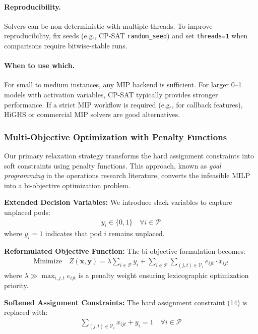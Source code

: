 \documentclass{article}
\begin{document}
\paragraph{Reproducibility.} Solvers can be non-deterministic with multiple threads. To improve reproducibility, fix seeds (e.g., CP-SAT \texttt{random\_seed}) and set \texttt{threads=1} when comparisons require bitwise-stable runs.

\paragraph{When to use which.} For small to medium instances, any MIP backend is sufficient. For larger 0--1 models with activation variables, CP-SAT typically provides stronger performance. If a strict MIP workflow is required (e.g., for callback features), HiGHS or commercial MIP solvers are good alternatives.

\subsubsection{Multi-Objective Optimization with Penalty Functions}

Our primary relaxation strategy transforms the hard assignment constraints into soft constraints using penalty functions. This approach, known as \textit{goal programming} in the operations research literature, converts the infeasible MILP into a bi-objective optimization problem.

\textbf{Extended Decision Variables:}
We introduce slack variables to capture unplaced pods:
\begin{align}
y_i \in \{0,1\} \quad \forall i \in \mathcal{P}
\end{align}
where $y_i = 1$ indicates that pod $i$ remains unplaced.

\textbf{Reformulated Objective Function:}
The bi-objective formulation becomes:
\begin{align}
\text{Minimize} \quad Z(\mathbf{x}, \mathbf{y}) = \lambda \sum_{i \in \mathcal{P}} y_i + \sum_{i \in \mathcal{P}} \sum_{(j,t) \in \mathcal{V}_i} e_{ijt} \cdot x_{ijt}
\end{align}
where $\lambda \gg \max_{i,j,t} e_{ijt}$ is a penalty weight ensuring lexicographic optimization priority.

\textbf{Softened Assignment Constraints:}
The hard assignment constraint (14) is replaced with:
\begin{align}
\sum_{(j,t) \in \mathcal{V}_i} x_{ijt} + y_i = 1 \quad \forall i \in \mathcal{P}
\end{align}
\end{document}

